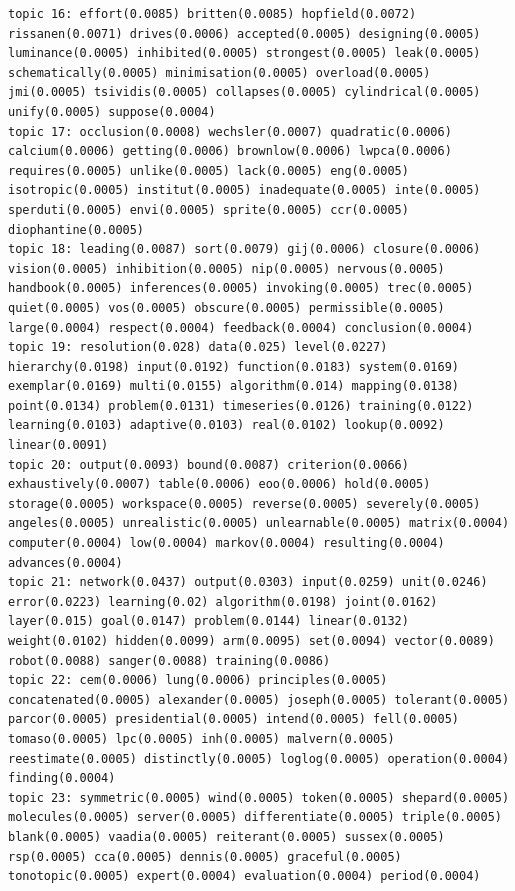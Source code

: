 \documentclass[10pt]{article}
\begin{document}
\begin{verbatim}
topic 16: effort(0.0085) britten(0.0085) hopfield(0.0072) rissanen(0.0071) drives(0.0006) accepted(0.0005) designing(0.0005) luminance(0.0005) inhibited(0.0005) strongest(0.0005) leak(0.0005) schematically(0.0005) minimisation(0.0005) overload(0.0005) jmi(0.0005) tsividis(0.0005) collapses(0.0005) cylindrical(0.0005) unify(0.0005) suppose(0.0004)
topic 17: occlusion(0.0008) wechsler(0.0007) quadratic(0.0006) calcium(0.0006) getting(0.0006) brownlow(0.0006) lwpca(0.0006) requires(0.0005) unlike(0.0005) lack(0.0005) eng(0.0005) isotropic(0.0005) institut(0.0005) inadequate(0.0005) inte(0.0005) sperduti(0.0005) envi(0.0005) sprite(0.0005) ccr(0.0005) diophantine(0.0005)
topic 18: leading(0.0087) sort(0.0079) gij(0.0006) closure(0.0006) vision(0.0005) inhibition(0.0005) nip(0.0005) nervous(0.0005) handbook(0.0005) inferences(0.0005) invoking(0.0005) trec(0.0005) quiet(0.0005) vos(0.0005) obscure(0.0005) permissible(0.0005) large(0.0004) respect(0.0004) feedback(0.0004) conclusion(0.0004)
topic 19: resolution(0.028) data(0.025) level(0.0227) hierarchy(0.0198) input(0.0192) function(0.0183) system(0.0169) exemplar(0.0169) multi(0.0155) algorithm(0.014) mapping(0.0138) point(0.0134) problem(0.0131) timeseries(0.0126) training(0.0122) learning(0.0103) adaptive(0.0103) real(0.0102) lookup(0.0092) linear(0.0091)
topic 20: output(0.0093) bound(0.0087) criterion(0.0066) exhaustively(0.0007) table(0.0006) eoo(0.0006) hold(0.0005) storage(0.0005) workspace(0.0005) reverse(0.0005) severely(0.0005) angeles(0.0005) unrealistic(0.0005) unlearnable(0.0005) matrix(0.0004) computer(0.0004) low(0.0004) markov(0.0004) resulting(0.0004) advances(0.0004)
topic 21: network(0.0437) output(0.0303) input(0.0259) unit(0.0246) error(0.0223) learning(0.02) algorithm(0.0198) joint(0.0162) layer(0.015) goal(0.0147) problem(0.0144) linear(0.0132) weight(0.0102) hidden(0.0099) arm(0.0095) set(0.0094) vector(0.0089) robot(0.0088) sanger(0.0088) training(0.0086)
topic 22: cem(0.0006) lung(0.0006) principles(0.0005) concatenated(0.0005) alexander(0.0005) joseph(0.0005) tolerant(0.0005) parcor(0.0005) presidential(0.0005) intend(0.0005) fell(0.0005) tomaso(0.0005) lpc(0.0005) inh(0.0005) malvern(0.0005) reestimate(0.0005) distinctly(0.0005) loglog(0.0005) operation(0.0004) finding(0.0004)
topic 23: symmetric(0.0005) wind(0.0005) token(0.0005) shepard(0.0005) molecules(0.0005) server(0.0005) differentiate(0.0005) triple(0.0005) blank(0.0005) vaadia(0.0005) reiterant(0.0005) sussex(0.0005) rsp(0.0005) cca(0.0005) dennis(0.0005) graceful(0.0005) tonotopic(0.0005) expert(0.0004) evaluation(0.0004) period(0.0004)

\end{verbatim}
\end{document}

